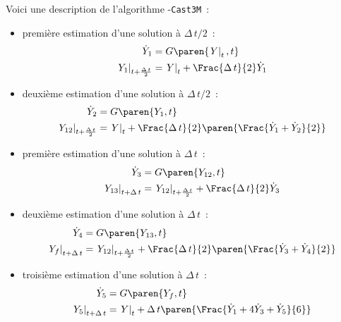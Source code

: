 \documentclass[rectoverso,pleiades,pstricks,leqno,anti]{texmf/note_technique_2010}
\newcommand{\castem}{\texttt{Cast3M}}
\newcommand{\debutpas}[1]{\ensuremath{\left.#1\right|_{t}}}
\newcommand{\finpas}[1]{\ensuremath{\left.#1\right|_{t+\Delta\, t}}}
\newcommand{\demipas}[1]{\ensuremath{\left.#1\right|_{t+\frac{\Delta\, t}{2}}}}
\begin{document}
Voici une description de l'algorithme -\castem{}~:
\begin{itemize}
\item première estimation d'une solution à \(\Delta\, t /2\)~:
\begin{subequations}
\begin{align}
  \dot{Y}_1 &= G\paren{\debutpas{Y},t} \\
  \demipas{Y_1} &= \debutpas{Y} + \Frac{\Delta\, t}{2} \dot{Y}_1
\end{align}
\end{subequations}
\item deuxième estimation d'une solution à \(\Delta\, t /2\)~:
\begin{subequations}
\begin{align}
  \dot{Y}_2 &= G\paren{Y_1,t} \\
  \demipas{Y_{12}} &= \debutpas{Y} + \Frac{\Delta\, t}{2} \paren{\Frac{\dot{Y}_1 + \dot{Y}_2}{2}}
\end{align}
\end{subequations}
\item première estimation d'une solution à \(\Delta\, t\)~:
\begin{subequations}
\begin{align}
  \dot{Y}_3 &= G\paren{Y_{12},t} \\
  \finpas{Y_{13}} &= \demipas{Y_{12}} + \Frac{\Delta\, t}{2} \dot{Y}_3
\end{align}
\end{subequations}
\item deuxième estimation d'une solution à \(\Delta\, t\)~:
\begin{subequations}
\begin{align}
  \dot{Y}_4 &= G\paren{Y_{13},t} \\
\label{eq:estimation_yf}
\finpas{Y_f} &= \demipas{Y_{12}} + \Frac{\Delta\,
  t}{2} \paren{\Frac{\dot{Y}_3 + \dot{Y}_4}{2}}
\end{align}
\end{subequations}
\item troisième estimation d'une solution à \(\Delta\, t\)~:
\begin{subequations}
\begin{align}
  \dot{Y}_5 &= G\paren{Y_f,t} \\
\label{eq:estimation_y5}
\finpas{Y_5} &= \debutpas{Y} + \Delta\, t \paren{\Frac{\dot{Y}_1 +
    4\dot{Y}_3 + \dot{Y}_5}{6}}
\end{align}
\end{subequations}
\end{itemize}
\end{document}

